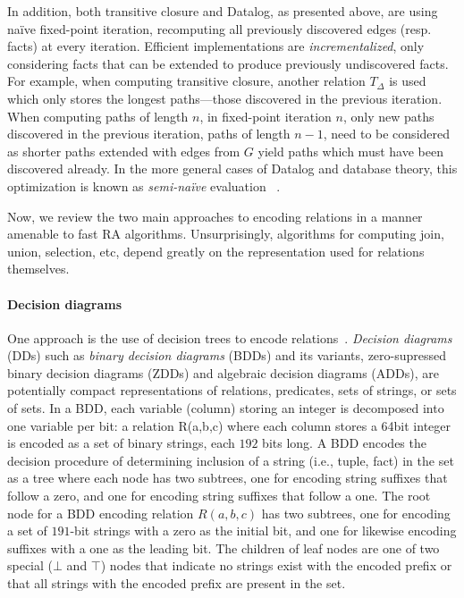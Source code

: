 In addition, both transitive closure and Datalog, as presented above, are using na\"ive fixed-point iteration, recomputing all previously discovered edges (resp. facts) at every iteration. Efficient implementations are \emph{incrementalized}, only considering facts that can be extended to produce previously undiscovered facts. For example, when computing transitive closure, another relation $T_\Delta$ is used which only stores the longest paths---those discovered in the previous iteration. When computing paths of length $n$, in fixed-point iteration $n$, only new paths discovered in the previous iteration, paths of length $n-1$, need to be considered as shorter paths extended with edges from $G$ yield paths which must have been discovered already. In the more general cases of Datalog and database theory, this optimization is known as \emph{semi-na\"ive} evaluation ~\cite{abiteboul1995foundations}.

Now, we review the two main approaches to encoding relations in a manner amenable to fast RA algorithms. Unsurprisingly, algorithms for computing join, union, selection, etc, depend greatly on the representation used for relations themselves. 

\paragraph{Decision diagrams} One approach is the use of decision trees to encode relations~\cite{Whaley:2004:CCP:996893.996859}. \emph{Decision diagrams} (DDs) such as \emph{binary decision diagrams} (BDDs) and its variants, zero-supressed binary decision diagrams (ZDDs) and algebraic decision diagrams (ADDs), are potentially compact representations of relations, predicates, sets of strings, or sets of sets. In a BDD, each variable (column) storing an integer is decomposed into one variable per bit: a relation R(a,b,c) where each column stores a 64bit integer is encoded as a set of binary strings, each $192$ bits long. A BDD encodes the decision procedure of determining inclusion of a string (i.e., tuple, fact) in the set as a tree where each node has two subtrees, one for encoding string suffixes that follow a zero, and one for encoding string suffixes that follow a one. The root node for a BDD encoding relation $R(a,b,c)$ has two subtrees, one for encoding a set of $191$-bit strings with a zero as the initial bit, and one for likewise encoding suffixes with a one as the leading bit. The children of leaf nodes are one of two special ($\bot$ and $\top$) nodes that indicate no strings exist with the encoded prefix or that all strings with the encoded prefix are present in the set. 

